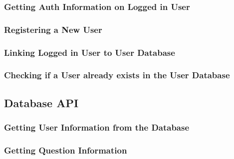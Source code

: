 \subsubsection{Getting Auth Information on Logged in User}


\subsubsection{Registering a New User}


\subsubsection{Linking Logged in User to User Database}


\subsubsection{Checking if a User already exists in the User Database}


\subsection{Database API}

\subsubsection{Getting User Information from the Database}


\subsubsection{Getting Question Information}

